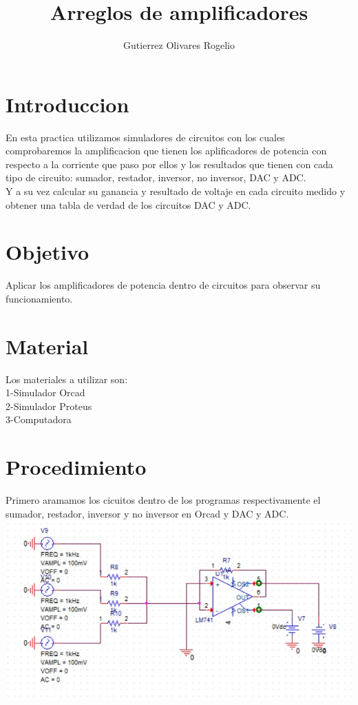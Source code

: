 \documentclass[12pt,a4paper]{report}
\author{Gutierrez Olivares Rogelio}
\title{Arreglos de amplificadores }
\begin{document}
\maketitle
\section{Introduccion }
En esta practica utilizamos simuladores de circuitos con los cuales comprobaremos la amplificacion que tienen los aplificadores de potencia con respecto a la corriente que paso por ellos y los resultados que tienen con cada tipo de circuito: sumador, restador, inversor, no inversor, DAC y ADC.
\\
Y a su vez calcular su ganancia y resultado de voltaje en cada circuito medido y obtener una tabla de verdad de los circuitos DAC y ADC.
\section{Objetivo}
Aplicar los amplificadores de potencia dentro de circuitos para observar su funcionamiento.
\section{Material}
Los materiales a utilizar son:
\\
1-Simulador Orcad
\\
2-Simulador Proteus
\\
3-Computadora
\section{Procedimiento}
Primero aramamos los cicuitos dentro de los programas respectivamente el sumador, restador, inversor y no inversor en Orcad y DAC y ADC.
\\
\includegraphics[scale=.5]{su.jpg}\\ 
\end{document}

